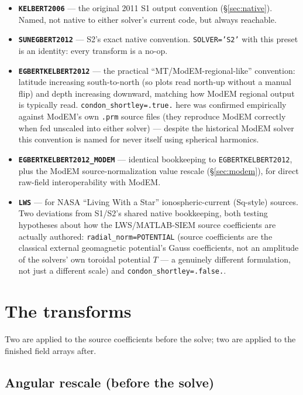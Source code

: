 \documentclass[11pt]{article}
\begin{document}
\begin{itemize}
\item \textbf{\texttt{KELBERT2006}} --- the original 2011 S1 output convention (\S\ref{sec:native}).
Named, not native to either solver's current code, but always reachable.
\item \textbf{\texttt{SUNEGBERT2012}} --- S2's exact native convention. \texttt{SOLVER='S2'} with
this preset is an identity: every transform is a no-op.
\item \textbf{\texttt{EGBERTKELBERT2012}} --- the practical ``MT/ModEM-regional-like'' convention:
latitude increasing south-to-north (so plots read north-up without a manual flip) and depth
increasing downward, matching how ModEM regional output is typically read.
\texttt{condon\_shortley=.true.} here was confirmed empirically against ModEM's own \texttt{.prm}
source files (they reproduce ModEM correctly when fed unscaled into either solver) --- despite the
historical ModEM solver this convention is named for never itself using spherical harmonics.
\item \textbf{\texttt{EGBERTKELBERT2012\_MODEM}} --- identical bookkeeping to
\texttt{EGBERTKELBERT2012}, plus the ModEM source-normalization value rescale
(\S\ref{sec:modem}), for direct raw-field interoperability with ModEM.
\item \textbf{\texttt{LWS}} --- for NASA ``Living With a Star'' ionospheric-current (Sq-style)
sources. Two deviations from S1/S2's shared native bookkeeping, both testing hypotheses about how
the LWS/MATLAB-SIEM source coefficients are actually authored: \texttt{radial\_norm=POTENTIAL}
(source coefficients are the classical external geomagnetic potential's Gauss coefficients, not an
amplitude of the solvers' own toroidal potential $T$ --- a genuinely different formulation, not
just a different scale) and \texttt{condon\_shortley=.false.}.
\end{itemize}

\section{The transforms}

Two are applied to the source coefficients before the solve; two are applied to the finished field
arrays after.

\subsection{Angular rescale (before the solve)}
\end{document}

